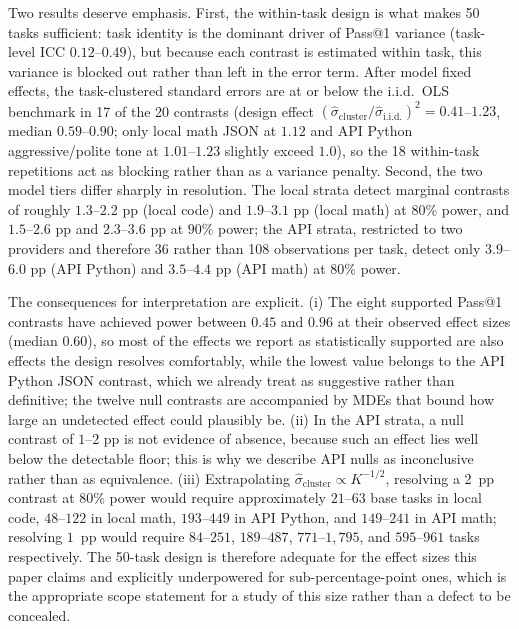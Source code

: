 \documentclass[a4paper,fleqn]{cas-sc}
\begin{document}
Two results deserve emphasis. First, the within-task design is what makes 50 tasks sufficient: task identity is the dominant driver of Pass@1 variance (task-level ICC $0.12$--$0.49$), but because each contrast is estimated within task, this variance is blocked out rather than left in the error term. After model fixed effects, the task-clustered standard errors are at or below the i.i.d.\ OLS benchmark in 17 of the 20 contrasts (design effect $(\hat{\sigma}_{\text{cluster}} / \hat{\sigma}_{\text{i.i.d.}})^2 = 0.41$--$1.23$, median $0.59$--$0.90$; only local math JSON at $1.12$ and API Python aggressive/polite tone at $1.01$--$1.23$ slightly exceed $1.0$), so the 18 within-task repetitions act as blocking rather than as a variance penalty. Second, the two model tiers differ sharply in resolution. The local strata detect marginal contrasts of roughly $1.3$--$2.2$ pp (local code) and $1.9$--$3.1$ pp (local math) at $80\%$ power, and $1.5$--$2.6$ pp and $2.3$--$3.6$ pp at $90\%$ power; the API strata, restricted to two providers and therefore 36 rather than 108 observations per task, detect only $3.9$--$6.0$ pp (API Python) and $3.5$--$4.4$ pp (API math) at $80\%$ power.

The consequences for interpretation are explicit. (i) The eight supported Pass@1 contrasts have achieved power between $0.45$ and $0.96$ at their observed effect sizes (median $0.60$), so most of the effects we report as statistically supported are also effects the design resolves comfortably, while the lowest value belongs to the API Python JSON contrast, which we already treat as suggestive rather than definitive; the twelve null contrasts are accompanied by MDEs that bound how large an undetected effect could plausibly be. (ii) In the API strata, a null contrast of $1$--$2$ pp is not evidence of absence, because such an effect lies well below the detectable floor; this is why we describe API nulls as inconclusive rather than as equivalence. (iii) Extrapolating $\hat{\sigma}_{\text{cluster}} \propto K^{-1/2}$, resolving a 2~pp contrast at $80\%$ power would require approximately $21$--$63$ base tasks in local code, $48$--$122$ in local math, $193$--$449$ in API Python, and $149$--$241$ in API math; resolving $1$~pp would require $84$--$251$, $189$--$487$, $771$--$1{,}795$, and $595$--$961$ tasks respectively. The 50-task design is therefore adequate for the effect sizes this paper claims and explicitly underpowered for sub-percentage-point ones, which is the appropriate scope statement for a study of this size rather than a defect to be concealed.
\end{document}
